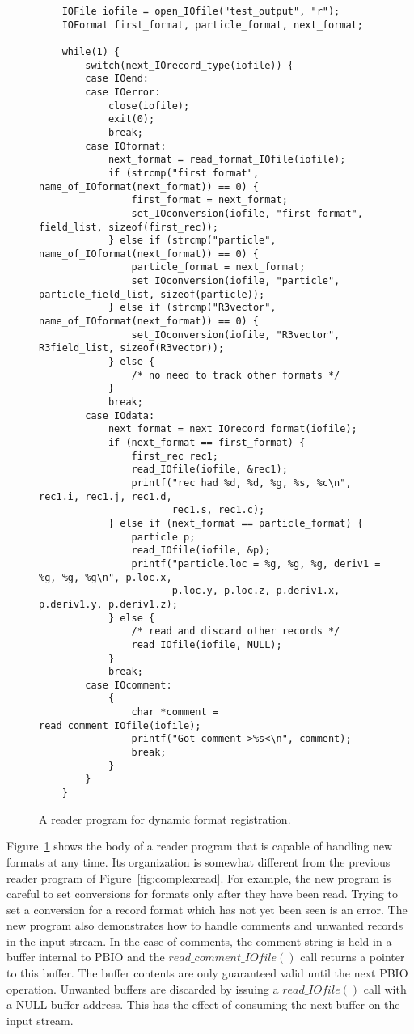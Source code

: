 \documentclass{article}
\begin{document}
\begin{figure}
\begin{verbatim}
    IOFile iofile = open_IOfile("test_output", "r");
    IOFormat first_format, particle_format, next_format;

    while(1) {
        switch(next_IOrecord_type(iofile)) {
        case IOend:
        case IOerror:
            close(iofile);
            exit(0);
            break;
        case IOformat:
            next_format = read_format_IOfile(iofile);
            if (strcmp("first format", name_of_IOformat(next_format)) == 0) {
                first_format = next_format;
                set_IOconversion(iofile, "first format", field_list, sizeof(first_rec));
            } else if (strcmp("particle", name_of_IOformat(next_format)) == 0) {
                particle_format = next_format;
                set_IOconversion(iofile, "particle", particle_field_list, sizeof(particle));
            } else if (strcmp("R3vector", name_of_IOformat(next_format)) == 0) {
                set_IOconversion(iofile, "R3vector", R3field_list, sizeof(R3vector));
            } else {
                /* no need to track other formats */
            }
            break;
        case IOdata:
            next_format = next_IOrecord_format(iofile);
            if (next_format == first_format) {
                first_rec rec1;
                read_IOfile(iofile, &rec1);
                printf("rec had %d, %d, %g, %s, %c\n", rec1.i, rec1.j, rec1.d, 
                       rec1.s, rec1.c);
            } else if (next_format == particle_format) {
                particle p;
                read_IOfile(iofile, &p);
                printf("particle.loc = %g, %g, %g, deriv1 = %g, %g, %g\n", p.loc.x,
                       p.loc.y, p.loc.z, p.deriv1.x, p.deriv1.y, p.deriv1.z); 
            } else {
                /* read and discard other records */
                read_IOfile(iofile, NULL);
            }
            break;
        case IOcomment:
            {
                char *comment = read_comment_IOfile(iofile);
                printf("Got comment >%s<\n", comment);
                break;
            }
        }
    }
\end{verbatim}
\caption{A reader program for dynamic format registration.\label{fig:dynread}}
\end{figure}

Figure~\ref{fig:dynread} shows the body of a reader program that is capable of
handling new formats at any time.  Its organization is somewhat different from
the previous reader program of Figure~\ref{fig:complexread}.  For example, the
new program is careful to set conversions for formats only after they have
been read.  Trying to set a conversion for a record format which has not yet
been seen is an error.  The new program also demonstrates how to handle
comments and unwanted records in the input stream.  In the case of comments,
the comment string is held in a buffer internal to PBIO and the
$read\_comment\_IOfile()$ call returns a pointer to this buffer.  The buffer
contents are only guaranteed valid until the next PBIO operation.  Unwanted
buffers are discarded by issuing a $read\_IOfile()$ call with a NULL buffer
address.  This has the effect of consuming the next buffer on the input
stream.  
\end{document}
